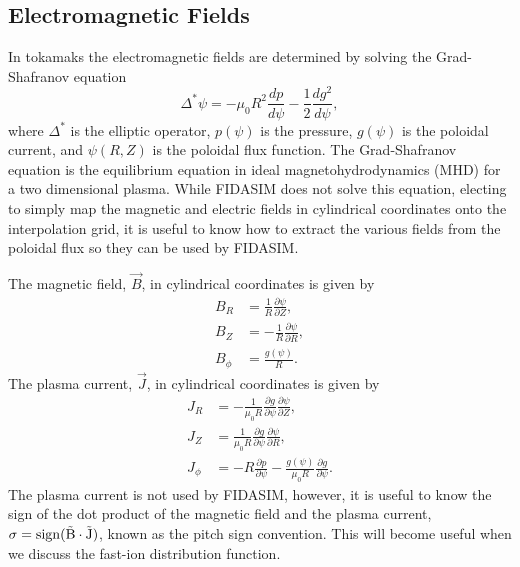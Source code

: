 \subsection{Electromagnetic Fields}
In tokamaks the electromagnetic fields are determined by solving the Grad-Shafranov equation
\begin{equation}\label{eq:grad_shafranov}
    \Delta^* \psi = - \mu_0 R^2 \frac{dp}{d\psi} - \frac{1}{2}\frac{dg^2}{d\psi},
\end{equation}
where $\Delta^*$ is the elliptic operator, $p(\psi)$ is the pressure, $g(\psi)$ is the poloidal current, and $\psi(R,Z)$ is the poloidal flux function.
The Grad-Shafranov equation is the equilibrium equation in ideal magnetohydrodynamics (MHD) for a two dimensional plasma. While FIDASIM does not solve this equation, electing to simply map the magnetic and electric fields in cylindrical coordinates onto the interpolation grid, it is useful to know how to extract the various fields from the poloidal flux so they can be used by FIDASIM.

The magnetic field, $\vec{B}$, in cylindrical coordinates is given by
\begin{equation}\label{eq:bfield}
\begin{split}
    B_R &=  \frac{1}{R}\frac{\partial \psi}{\partial Z}, \\
    B_Z &= -\frac{1}{R}\frac{\partial \psi}{\partial R}, \\
    B_{\phi} &= \frac{g(\psi)}{R}.
\end{split}
\end{equation}
The plasma current, $\vec{J}$, in cylindrical coordinates is given by
\begin{equation}\label{eq:jfield}
\begin{split}
    J_R &= -\frac{1}{\mu_0 R}\frac{\partial g}{\partial \psi} \frac{\partial \psi}{\partial Z}, \\
    J_Z &= \frac{1}{\mu_0 R}\frac{\partial g}{\partial \psi} \frac{\partial \psi}{\partial R}, \\
    J_{\phi} &= -R \frac{\partial p}{\partial \psi} - \frac{g(\psi)}{\mu_0 R}\frac{\partial g}{\partial \psi}.
\end{split}
\end{equation}
The plasma current is not used by FIDASIM, however, it is useful to know the sign of the dot product of the magnetic field and the plasma current, $\sigma = \rm{sign}(\vec{B}\cdot\vec{J})$, known as the pitch sign convention. This will become useful when we discuss the fast-ion distribution function.

